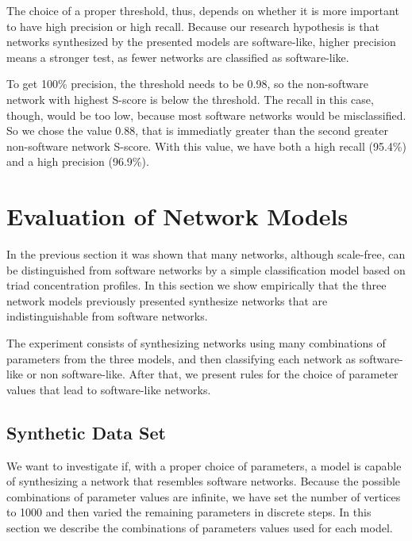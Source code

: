 The choice of a proper threshold, thus, depends on whether it is more important
to have high precision or high recall. Because our research hypothesis is that
networks synthesized by the presented models are software-like, higher precision
means a stronger test, as fewer networks are classified as software-like.

To get 100\% precision, the threshold needs to be 0.98, so the non-software
network with highest S-score is below the threshold. The recall in this case,
though, would be too low, because most software networks would be misclassified.
So we chose the value 0.88, that is immediatly greater than the second greater
non-software network S-score. With this value, we have both a high recall
(95.4\%) and a high precision (96.9\%).



\section{Evaluation of Network Models}

In the previous section it was shown that many networks, although scale-free,
can be distinguished from software networks by a simple classification model
based on triad concentration profiles. In this section we show empirically that
the three network models previously presented synthesize networks that are
indistinguishable from software networks.

The experiment consists of synthesizing networks using many combinations of
parameters from the three models, and then classifying each network as
software-like or non software-like. After that, we present rules for the choice
of parameter values that lead to software-like networks.

\subsection{Synthetic Data Set}

We want to investigate if, with a proper choice of parameters, a model is
capable of synthesizing a network that resembles software networks. Because the
possible combinations of parameter values are infinite, we have set the number
of vertices to 1000 and then varied the remaining parameters in discrete steps.
In this section we describe the combinations of parameters values used for each
model.

